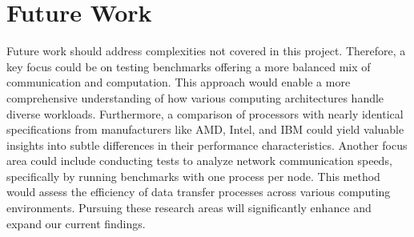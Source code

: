 \documentclass{article}
\begin{document}
\section{Future Work}
Future work should address complexities not covered in this project. Therefore, a key focus could be on testing benchmarks offering a more balanced mix of communication and computation. This approach would enable a more comprehensive understanding of how various computing architectures handle diverse workloads. Furthermore, a comparison of processors with nearly identical specifications from manufacturers like AMD, Intel, and IBM could yield valuable insights into subtle differences in their performance characteristics. Another focus area could include conducting tests to analyze network communication speeds, specifically by running benchmarks with one process per node. This method would assess the efficiency of data transfer processes across various computing environments. Pursuing these research areas will significantly enhance and expand our current findings.

\printbibliography
\end{document}
